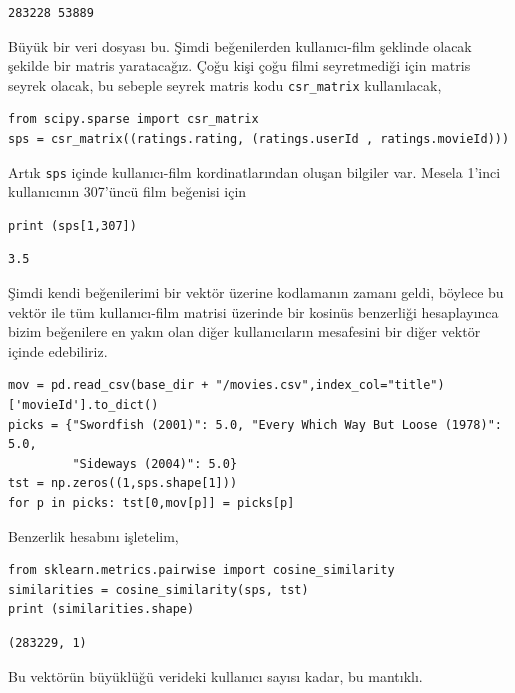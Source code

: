 \documentclass[12pt,fleqn]{article}\usepackage{../../common}
\begin{document}
\begin{verbatim}
283228 53889
\end{verbatim}

Büyük bir veri dosyası bu. Şimdi beğenilerden kullanıcı-film şeklinde olacak
şekilde bir matris yaratacağız. Çoğu kişi çoğu filmi seyretmediği için matris
seyrek olacak, bu sebeple seyrek matris kodu \verb!csr_matrix! kullanılacak, 

\begin{verbatim}
from scipy.sparse import csr_matrix
sps = csr_matrix((ratings.rating, (ratings.userId , ratings.movieId)))
\end{verbatim}

Artık \verb!sps! içinde kullanıcı-film kordinatlarından oluşan bilgiler
var. Mesela 1'inci kullanıcının 307'üncü film beğenisi için

\begin{verbatim}
print (sps[1,307])
\end{verbatim}

\begin{verbatim}
3.5
\end{verbatim}

Şimdi kendi beğenilerimi bir vektör üzerine kodlamanın zamanı geldi, böylece bu
vektör ile tüm kullanıcı-film matrisi üzerinde bir kosinüs benzerliği
hesaplayınca bizim beğenilere en yakın olan diğer kullanıcıların mesafesini bir
diğer vektör içinde edebiliriz.

\begin{verbatim}
mov = pd.read_csv(base_dir + "/movies.csv",index_col="title")['movieId'].to_dict()
picks = {"Swordfish (2001)": 5.0, "Every Which Way But Loose (1978)": 5.0,
         "Sideways (2004)": 5.0}
tst = np.zeros((1,sps.shape[1]))
for p in picks: tst[0,mov[p]] = picks[p]
\end{verbatim}

Benzerlik hesabını işletelim,

\begin{verbatim}
from sklearn.metrics.pairwise import cosine_similarity
similarities = cosine_similarity(sps, tst)
print (similarities.shape)
\end{verbatim}

\begin{verbatim}
(283229, 1)
\end{verbatim}

Bu vektörün büyüklüğü verideki kullanıcı sayısı kadar, bu mantıklı.
\end{document}
